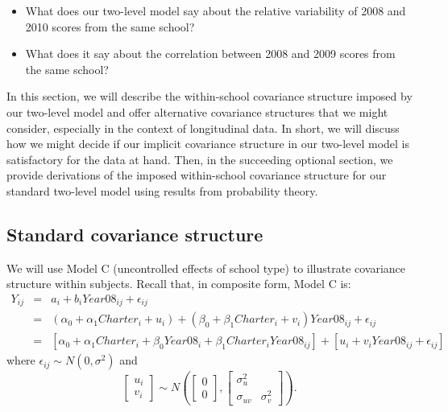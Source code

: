 \documentclass[
]{krantz}
\providecommand{\tightlist}{%
  \setlength{\itemsep}{0pt}\setlength{\parskip}{0pt}}
\begin{document}
\begin{itemize}
\tightlist
\item
  What does our two-level model say about the relative variability of 2008 and 2010 scores from the same school?
\item
  What does it say about the correlation between 2008 and 2009 scores from the same school?
\end{itemize}

In this section, we will describe the within-school covariance structure imposed by our two-level model and offer alternative covariance structures that we might consider, especially in the context of longitudinal data. In short, we will discuss how we might decide if our implicit covariance structure in our two-level model is satisfactory for the data at hand. Then, in the succeeding optional section, we provide derivations of the imposed within-school covariance structure for our standard two-level model using results from probability theory.

\hypertarget{standarderror}{%
\subsection{Standard covariance structure}\label{standarderror}}

We will use Model C (uncontrolled effects of school type) to illustrate covariance structure within subjects. Recall that, in composite form, Model C is:
\begin{align*}
Y_{ij} & = & a_{i}+b_{i}Year08_{ij}+ \epsilon_{ij} \\
       & = & (\alpha_{0}+ \alpha_{1}Charter_i + u_{i}) + (\beta_{0}+\beta_{1}Charter_i +v_{i}) Year08_{ij} + \epsilon_{ij} \\
       & = & [\alpha_{0}+\alpha_{1}Charter_i + \beta_{0}Year08_i + \beta_{1}Charter_iYear08_{ij}] + [u_{i} + v_{i}Year08_{ij} + \epsilon_{ij}]
\end{align*}
\noindent where \(\epsilon_{ij}\sim N(0,\sigma^2)\) and
\[ \left[ \begin{array}{c}
            u_{i} \\ v_{i}
          \end{array}  \right] \sim N \left( \left[
          \begin{array}{c}
            0 \\ 0
          \end{array} \right], \left[
          \begin{array}{cc}
            \sigma_{u}^{2} & \\
            \sigma_{uv} & \sigma_{v}^{2}
          \end{array} \right] \right) . \]
\end{document}
